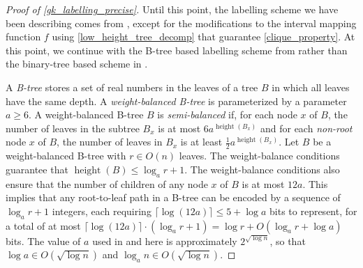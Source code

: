 \documentclass{patmorin}
\renewcommand{\ge}{\geqslant}
\renewcommand{\le}{\leqslant}
\newcommand{\defin}[1]{\emph{\textcolor{brightmaroon}{#1}}}
\DeclareMathOperator{\height}{height}
\newcommand{\Oh}{O}
\begin{document}
\begin{proof}[Proof of \cref{gk_labelling_precise}]
  Until this point, the labelling scheme we have been describing comes from \cite{dujmovic.esperet.ea:adjacency}, except for the modifications to the interval mapping function $f$ using \cref{low_height_tree_decomp} that guarantee \ref{clique_property}.  At this point, we continue with the B-tree based labelling scheme from \cite{gawrychowski.janczewski:simpler} rather than the binary-tree based scheme in \cite{dujmovic.esperet.ea:adjacency}.

  A \defin{B-tree} stores a set of real numbers in the leaves of a tree $B$ in which all leaves have the same depth.
  A \defin{weight-balanced B-tree} is parameterized by a parameter $a\ge 6$.  A weight-balanced B-tree $B$ is \defin{semi-balanced} if, for each node $x$ of $B$, the number of leaves in the subtree $B_x$ is at most $6a^{\height(B_x)}$ and for each \emph{non-root} node $x$ of $B$, the number of leaves in $B_x$ is at least $\tfrac{1}{2}a^{\height(B_x)}$.
  Let $B$ be a weight-balanced B-tree with $r\in O(n)$ leaves.  The weight-balance conditions guarantee that $\height(B)\le \log_a r + 1$.
  The weight-balance conditions also ensure that the number of children of any node $x$ of $B$ is at most $12a$.
  This implies that any root-to-leaf path in a B-tree can be encoded by a sequence of $\log_a r+1$ integers, each requiring $\lceil\log(12a)\rceil\le 5+\log a$ bits to represent, for a total of at most $\lceil\log(12a)\rceil\cdot(\log_a r+1)=\log r + \Oh(\log_a r + \log a)$ bits.
  The value of $a$ used in \cite{gawrychowski.janczewski:simpler} and here is approximately $2^{\sqrt{\log n}}$, so that $\log a\in O(\sqrt{\log n})$ and $\log_a n\in O(\sqrt{\log n})$.
  


\end{proof}
\end{document}
